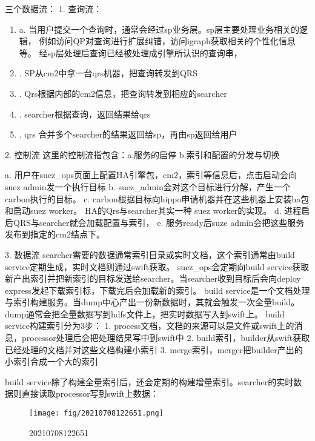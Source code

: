 三个数据流：
1. 查询流：
	\begin{enumerate}
    \item a. 当用户提交一个查询时，通常会经过sp业务层。sp层主要处理业务相关的逻辑，
       例如访问QP对查询进行扩展纠错，访问igraph获取相关的个性化信息等。
       经sp层处理后查询已经被处理成引擎所认识的查询串，
    \item. SP从cm2中拿一台qrs机器，把查询转发到QRS
    \item. Qrs根据内部的cm2信息，把查询转发到相应的searcher
  	\item. searcher根据查询，返回结果给qrs
  	\item. qrs 合并多个searcher的结果返回给sp，再由sp返回给用户
  	\end{enumerate}

2. 控制流
	这里的控制流指包含：a.服务的启停 b.索引和配置的分发与切换 
	\begin{enumerate}
    a. 用户在suez_ops页面上配置HA引擎包，cm2，索引等信息后，点击启动会向suez admin发一个执行目标
    b. suez_admin会对这个目标进行分解，产生一个carbon执行的目标。
    c. carbon根据目标向hippo申请机器并在这些机器上安装ha包和启动suez worker。
       HA的Qrs与searcher其实一种 suez worker的实现。
    d. 进程启后QRS与searcher就会加载配置与索引，
    e. 服务ready后suze admin会把这些服务发布到指定的cm2结点下。
    \end{enumerate}

3. 数据流
	searcher需要的数据通常索引目录或实时文档，这个索引通常由build service定期生成，实时文档则通过swift获取。
	suez_ops会定期向build service获取新产出索引并把新索引的目标发送给searcher。当searcher收到目标后会向deploy express发起下载索引标，下载完后会加载新的索引。
	build service是一个文档处理与索引构建服务。当dump中心产出一份新数据时，其就会触发一次全量build。dump通常会把全量数据写到hdfs文件上，把实时数据写入到swift上。
	build service构建索引分为3步：         
	1. process文档，文档的来源可以是文件或swift上的消息，processor处理后会把处理结果写中到swift中
    2. build索引，builder从swift获取已经处理的文档并对这些文档构建小索引
    3. merge索引，merger把builder产出的小索引合成一个大的索引

build service除了构建全量索引后，还会定期的构建增量索引。searcher的实时数据则直接读取processor写到swift上数据：


	\begin{figure}[h]
	\centering
	\texttt{[image: fig/20210708122651.png]}
	\caption{20210708122651} \label{fig:gansamples}
	\end{figure}


